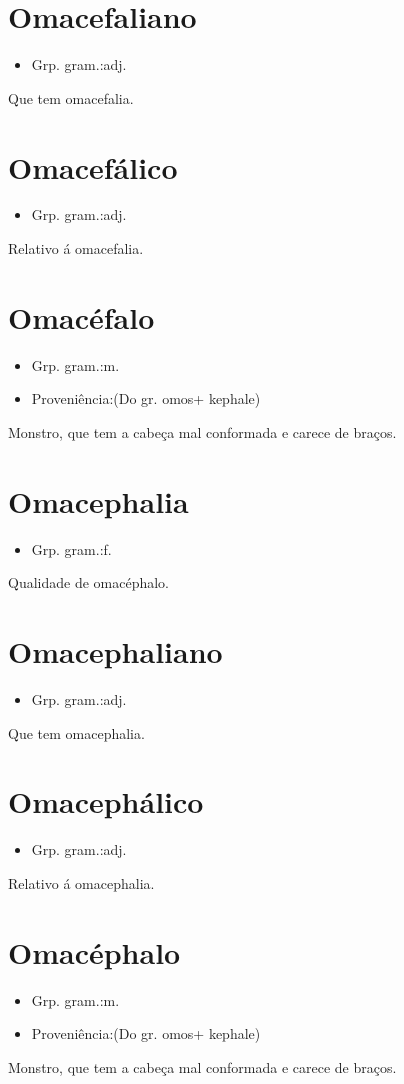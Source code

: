 \section{Omacefaliano}
\begin{itemize}
\item {Grp. gram.:adj.}
\end{itemize}
Que tem omacefalia.
\section{Omacefálico}
\begin{itemize}
\item {Grp. gram.:adj.}
\end{itemize}
Relativo á omacefalia.
\section{Omacéfalo}
\begin{itemize}
\item {Grp. gram.:m.}
\end{itemize}
\begin{itemize}
\item {Proveniência:(Do gr. \textunderscore omos\textunderscore  + \textunderscore kephale\textunderscore )}
\end{itemize}
Monstro, que tem a cabeça mal conformada e carece de braços.
\section{Omacephalia}
\begin{itemize}
\item {Grp. gram.:f.}
\end{itemize}
Qualidade de omacéphalo.
\section{Omacephaliano}
\begin{itemize}
\item {Grp. gram.:adj.}
\end{itemize}
Que tem omacephalia.
\section{Omacephálico}
\begin{itemize}
\item {Grp. gram.:adj.}
\end{itemize}
Relativo á omacephalia.
\section{Omacéphalo}
\begin{itemize}
\item {Grp. gram.:m.}
\end{itemize}
\begin{itemize}
\item {Proveniência:(Do gr. \textunderscore omos\textunderscore  + \textunderscore kephale\textunderscore )}
\end{itemize}
Monstro, que tem a cabeça mal conformada e carece de braços.
